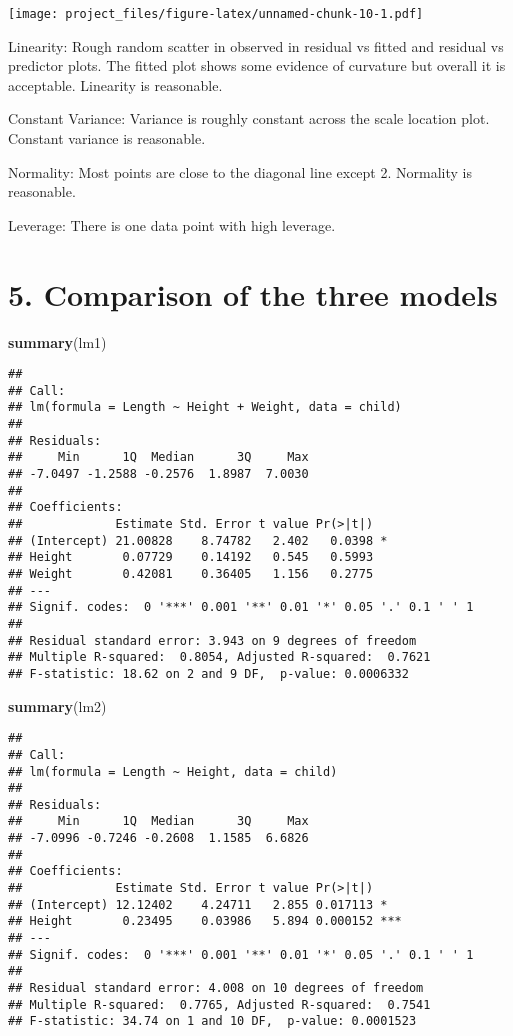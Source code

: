 \documentclass[]{article}
\newenvironment{Shaded}{\begin{snugshade}}{\end{snugshade}}
\newcommand{\KeywordTok}[1]{\textcolor[rgb]{0.13,0.29,0.53}{\textbf{#1}}}
\newcommand{\NormalTok}[1]{#1}
\begin{document}
\texttt{[image: project\_files/figure-latex/unnamed-chunk-10-1.pdf]}

Linearity: Rough random scatter in observed in residual vs fitted and
residual vs predictor plots. The fitted plot shows some evidence of
curvature but overall it is acceptable. Linearity is reasonable.

Constant Variance: Variance is roughly constant across the scale
location plot. Constant variance is reasonable.

Normality: Most points are close to the diagonal line except 2.
Normality is reasonable.

Leverage: There is one data point with high leverage.

\section{5. Comparison of the three
models}\label{comparison-of-the-three-models}

\begin{Shaded}
\begin{Highlighting}[]
\KeywordTok{summary}\NormalTok{(lm1)}
\end{Highlighting}
\end{Shaded}

\begin{verbatim}
## 
## Call:
## lm(formula = Length ~ Height + Weight, data = child)
## 
## Residuals:
##     Min      1Q  Median      3Q     Max 
## -7.0497 -1.2588 -0.2576  1.8987  7.0030 
## 
## Coefficients:
##             Estimate Std. Error t value Pr(>|t|)  
## (Intercept) 21.00828    8.74782   2.402   0.0398 *
## Height       0.07729    0.14192   0.545   0.5993  
## Weight       0.42081    0.36405   1.156   0.2775  
## ---
## Signif. codes:  0 '***' 0.001 '**' 0.01 '*' 0.05 '.' 0.1 ' ' 1
## 
## Residual standard error: 3.943 on 9 degrees of freedom
## Multiple R-squared:  0.8054, Adjusted R-squared:  0.7621 
## F-statistic: 18.62 on 2 and 9 DF,  p-value: 0.0006332
\end{verbatim}

\begin{Shaded}
\begin{Highlighting}[]
\KeywordTok{summary}\NormalTok{(lm2)}
\end{Highlighting}
\end{Shaded}

\begin{verbatim}
## 
## Call:
## lm(formula = Length ~ Height, data = child)
## 
## Residuals:
##     Min      1Q  Median      3Q     Max 
## -7.0996 -0.7246 -0.2608  1.1585  6.6826 
## 
## Coefficients:
##             Estimate Std. Error t value Pr(>|t|)    
## (Intercept) 12.12402    4.24711   2.855 0.017113 *  
## Height       0.23495    0.03986   5.894 0.000152 ***
## ---
## Signif. codes:  0 '***' 0.001 '**' 0.01 '*' 0.05 '.' 0.1 ' ' 1
## 
## Residual standard error: 4.008 on 10 degrees of freedom
## Multiple R-squared:  0.7765, Adjusted R-squared:  0.7541 
## F-statistic: 34.74 on 1 and 10 DF,  p-value: 0.0001523
\end{verbatim}
\end{document}

